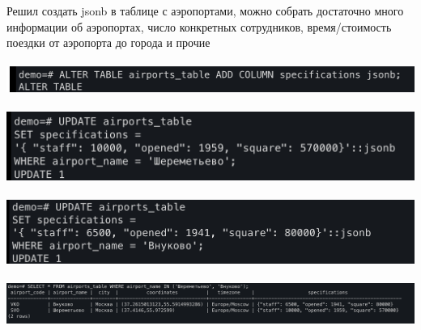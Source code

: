 \documentclass[a4paper,12pt]{article}
\begin{document}
\clearpage
Решил создать jsonb в таблице с аэропортами, можно собрать достаточно много информации об аэропортах, число конкретных сотрудников, время/стоимость поездки от аэропорта до города и прочие
\\\\
\includegraphics[scale=0.36]{182.png}
\\\\
\includegraphics[scale=0.36]{183.png}
\\\\
\includegraphics[scale=0.36]{184.png}
\\\\
\includegraphics[scale=0.36]{185.png}
\end{document}

